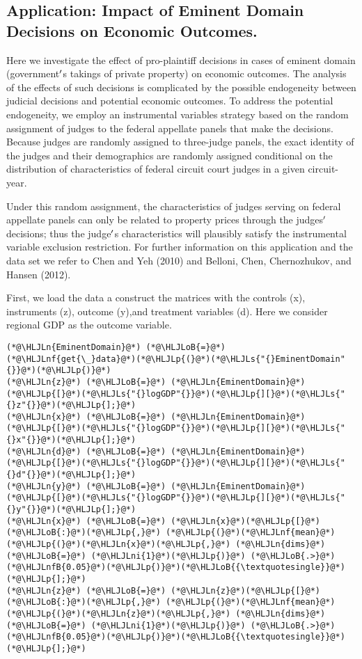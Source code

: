 \documentclass[12pt,a4paper]{article}
\newcommand{\HLJLn}[1]{#1}
\newcommand{\HLJLnf}[1]{\textcolor[RGB]{66,102,213}{#1}}
\newcommand{\HLJLs}[1]{\textcolor[RGB]{201,61,57}{#1}}
\newcommand{\HLJLnfB}[1]{\textcolor[RGB]{59,151,46}{#1}}
\newcommand{\HLJLni}[1]{\textcolor[RGB]{59,151,46}{#1}}
\newcommand{\HLJLoB}[1]{\textcolor[RGB]{102,102,102}{\textbf{#1}}}
\newcommand{\HLJLp}[1]{#1}
\begin{document}
\subsection{Application: Impact of Eminent Domain Decisions on Economic Outcomes.}
Here we investigate the effect of pro-plaintiff decisions in cases of eminent domain (government\ensuremath{\rq}s takings of private property) on economic outcomes. The analysis of the effects of such decisions is complicated by the possible endogeneity between judicial decisions and potential economic outcomes. To address the potential endogeneity, we employ an instrumental variables strategy based on the random assignment of judges to the federal appellate panels that make the decisions. Because judges are randomly assigned to three-judge panels, the exact identity of the judges and their demographics are randomly assigned conditional on the distribution of characteristics of federal circuit court judges in a given circuit-year.

Under this random assignment, the characteristics of judges serving on federal appellate panels can only be related to property prices through the judges\ensuremath{\rq} decisions; thus the judge\ensuremath{\rq}s characteristics will plausibly satisfy the instrumental variable exclusion restriction. For further information on this application and the data set we refer to Chen and Yeh (2010) and Belloni, Chen, Chernozhukov, and Hansen (2012).

First, we load the data a construct the matrices with the controls (x), instruments (z), outcome (y),and treatment variables (d). Here we consider regional GDP as the outcome variable.


\begin{lstlisting}
(*@\HLJLn{EminentDomain}@*) (*@\HLJLoB{=}@*) (*@\HLJLnf{get{\_}data}@*)(*@\HLJLp{(}@*)(*@\HLJLs{"{}EminentDomain"{}}@*)(*@\HLJLp{)}@*)
(*@\HLJLn{z}@*) (*@\HLJLoB{=}@*) (*@\HLJLn{EminentDomain}@*)(*@\HLJLp{[}@*)(*@\HLJLs{"{}logGDP"{}}@*)(*@\HLJLp{][}@*)(*@\HLJLs{"{}z"{}}@*)(*@\HLJLp{];}@*)
(*@\HLJLn{x}@*) (*@\HLJLoB{=}@*) (*@\HLJLn{EminentDomain}@*)(*@\HLJLp{[}@*)(*@\HLJLs{"{}logGDP"{}}@*)(*@\HLJLp{][}@*)(*@\HLJLs{"{}x"{}}@*)(*@\HLJLp{];}@*)
(*@\HLJLn{d}@*) (*@\HLJLoB{=}@*) (*@\HLJLn{EminentDomain}@*)(*@\HLJLp{[}@*)(*@\HLJLs{"{}logGDP"{}}@*)(*@\HLJLp{][}@*)(*@\HLJLs{"{}d"{}}@*)(*@\HLJLp{];}@*)
(*@\HLJLn{y}@*) (*@\HLJLoB{=}@*) (*@\HLJLn{EminentDomain}@*)(*@\HLJLp{[}@*)(*@\HLJLs{"{}logGDP"{}}@*)(*@\HLJLp{][}@*)(*@\HLJLs{"{}y"{}}@*)(*@\HLJLp{];}@*)
(*@\HLJLn{x}@*) (*@\HLJLoB{=}@*) (*@\HLJLn{x}@*)(*@\HLJLp{[}@*)(*@\HLJLoB{:}@*)(*@\HLJLp{,}@*) (*@\HLJLp{(}@*)(*@\HLJLnf{mean}@*)(*@\HLJLp{(}@*)(*@\HLJLn{x}@*)(*@\HLJLp{,}@*) (*@\HLJLn{dims}@*) (*@\HLJLoB{=}@*) (*@\HLJLni{1}@*)(*@\HLJLp{)}@*) (*@\HLJLoB{.>}@*) (*@\HLJLnfB{0.05}@*)(*@\HLJLp{)}@*)(*@\HLJLoB{{\textquotesingle}}@*)(*@\HLJLp{];}@*)
(*@\HLJLn{z}@*) (*@\HLJLoB{=}@*) (*@\HLJLn{z}@*)(*@\HLJLp{[}@*)(*@\HLJLoB{:}@*)(*@\HLJLp{,}@*) (*@\HLJLp{(}@*)(*@\HLJLnf{mean}@*)(*@\HLJLp{(}@*)(*@\HLJLn{z}@*)(*@\HLJLp{,}@*) (*@\HLJLn{dims}@*) (*@\HLJLoB{=}@*) (*@\HLJLni{1}@*)(*@\HLJLp{)}@*) (*@\HLJLoB{.>}@*) (*@\HLJLnfB{0.05}@*)(*@\HLJLp{)}@*)(*@\HLJLoB{{\textquotesingle}}@*)(*@\HLJLp{];}@*)
\end{lstlisting}
\end{document}
